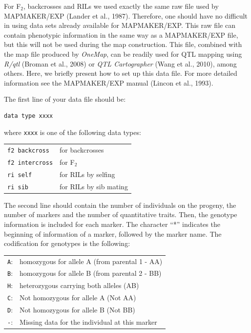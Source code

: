 \documentclass[letterpaper,12pt,oneside]{article}
\begin{document}
For F$_2$, backcrosses and RILs we used exactly the same raw file used by MAPMAKER/EXP (Lander et al., 1987). Therefore, one should have no difficult in using data sets already available for MAPMAKER/EXP. This raw file can contain phenotypic information in the same way as a MAPMAKER/EXP file, but this will not be used during the map construction. This file, combined with the map file produced by {\sl OneMap}, can be readily used for QTL mapping using {\it R/qtl} (Broman et al., 2008) or {\it QTL Cartographer} (Wang et al., 2010), among others. Here, we briefly present how to set up this data file. For more detailed information see the MAPMAKER/EXP manual (Lincon et al., 1993).

The first line of your data file should be:

\begin{verbatim}
data type xxxx
\end{verbatim}

where {\tt xxxx} is one of the following data types:

\begin{table}[!ht]
  \centering
\begin{tabular}{l l}
  {\tt f2 backcross}  & for backcrosses \\
  {\tt f2 intercross} & for F$_2$ \\
  {\tt ri self}       & for RILs by selfing \\
  {\tt ri sib}        & for RILs by sib mating \\
\end{tabular}
\end{table}

The second line should contain the number of individuals on the progeny, the number of markers and the number of quantitative traits. Then, the genotype information is included for each marker. The character ``*'' indicates the beginning of information of a marker, followed by the marker name. The codification for genotypes is the following:

\begin{table}[!ht]
  \centering
\begin{tabular}{ l l}
  {\tt A}: & homozygous for allele A (from parental 1 - AA)\\
  {\tt B}: & homozygous for allele B (from parental 2 - BB)\\
  {\tt H}: & heterozygous carrying both alleles (AB)\\
  {\tt C}: & Not homozygous for allele A (Not AA)\\
  {\tt D}: & Not homozygous for allele B (Not BB)\\
  {\tt -}: & Missing data for the individual at this marker \\
\end{tabular}
\end{table}
\end{document}
